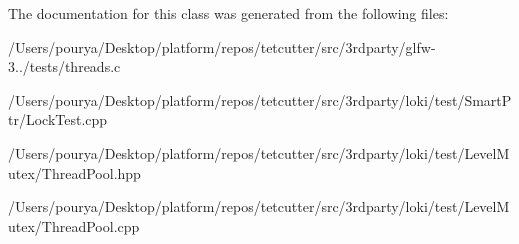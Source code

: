 The documentation for this class was generated from the following files\+:\begin{DoxyCompactItemize}
\item 
/\+Users/pourya/\+Desktop/platform/repos/tetcutter/src/3rdparty/glfw-\/3../tests/threads.\+c\item 
/\+Users/pourya/\+Desktop/platform/repos/tetcutter/src/3rdparty/loki/test/\+Smart\+Ptr/Lock\+Test.\+cpp\item 
/\+Users/pourya/\+Desktop/platform/repos/tetcutter/src/3rdparty/loki/test/\+Level\+Mutex/Thread\+Pool.\+hpp\item 
/\+Users/pourya/\+Desktop/platform/repos/tetcutter/src/3rdparty/loki/test/\+Level\+Mutex/Thread\+Pool.\+cpp\end{DoxyCompactItemize}
